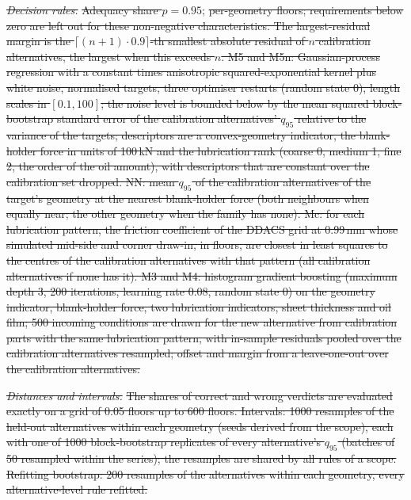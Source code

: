 \documentclass[pdflatex,sn-basic,lineno]{sn-jnl} %
\providecommand{\DIFdel}[1]{{\protect\color{red}\sout{#1}}}                      %
\providecommand{\DIFdelbegin}{} %
\providecommand{\DIFdelend}{} %
\newcommand{\DIFscaledelfig}{0.5}
\newlength{\DIFdelgraphicswidth} %
\newlength{\DIFdelgraphicsheight} %
\newcommand{\DIFdelincludegraphics}[2][]{%
\sbox{\DIFdelgraphicsbox}{\DIFOincludegraphics[#1]{#2}}%
\settoboxwidth{\DIFdelgraphicswidth}{\DIFdelgraphicsbox} %
\settoboxtotalheight{\DIFdelgraphicsheight}{\DIFdelgraphicsbox} %
\scalebox{\DIFscaledelfig}{%
\parbox[b]{\DIFdelgraphicswidth}{\usebox{\DIFdelgraphicsbox}\\[-\baselineskip] \rule{\DIFdelgraphicswidth}{0em}}\llap{\resizebox{\DIFdelgraphicswidth}{\DIFdelgraphicsheight}{%
\setlength{\unitlength}{\DIFdelgraphicswidth}%
\begin{picture}(1,1)%
\thicklines\linethickness{2pt} %
{\color[rgb]{1,0,0}\put(0,0){\framebox(1,1){}}}%
{\color[rgb]{1,0,0}\put(0,0){\line( 1,1){1}}}%
{\color[rgb]{1,0,0}\put(0,1){\line(1,-1){1}}}%
\end{picture}%
}\hspace*{3pt}}} %
} %
\DeclareRobustCommand{\DIFdelbegin}{\DIFOdelbegin \let\includegraphics\DIFdelincludegraphics} %
\DeclareRobustCommand{\DIFdelend}{\DIFOaddend \let\includegraphics\DIFOincludegraphics} %
\begin{document}
\emph{\DIFdel{Decision rules.}} %
\DIFdel{Adequacy share $p=0.95$}\DIFdelend ; \DIFdelbegin \DIFdel{per-geometry floors; requirements below zero are left out for these non-negative characteristics. The largest-residual margin is the $\lceil (n+1)\cdot 0.9\rceil$-th smallest absolute residual of $n$ calibration alternatives, the largest when this exceeds $n$. M5 and M5n: Gaussian-process regression with a constant times anisotropic squared-exponential kernel plus white noise, normalised targets, three optimiser restarts (random state 0), length scales in $[0.1, 100]$; the noise level is bounded below by the mean squared block-bootstrap standard error of the calibration alternatives' $q_{95}$ relative to the variance of the targets; descriptors are a convex-geometry indicator, the blank-holder force in units of 100\,kN and the lubrication rank (coarse 0, medium 1, fine 2, the order of the oil amount), with descriptors that are constant over the calibration set dropped. NN: mean $q_{95}$ of the calibration alternatives of the target's geometry at the nearest blank-holder force (both neighbours when equally near; the other geometry when the family has none). Mc: for each lubrication pattern, the friction coefficient of the DDACS grid at 0.99\,mm whose simulated mid-side and corner draw-in, in floors, are closest in least squares to the centres of the calibration alternatives with that pattern (all calibration alternatives if none has it). M3 and M4: histogram gradient boosting (maximum depth 3, 200 iterations, learning rate 0.08, random state 0) on the geometry indicator, blank-holder force, two lubrication indicators, sheet thickness and oil film; 500 incoming conditions are drawn for the new alternative from calibration parts with the same lubrication pattern, with in-sample residuals pooled over the calibration alternatives resampled; offset and margin from a leave-one-out over the calibration alternatives.
}%

\emph{\DIFdel{Distances and intervals.}} %
\DIFdel{The shares of correct and wrong verdicts are evaluated exactly on a grid of 0.05 floors up to 600 floors. Intervals: 1000 resamples of the held-out alternatives within each geometry (seeds derived from the scope), each with one of 1000 block-bootstrap replicates of every alternative's $q_{95}$ (batches of 50 resampled within the series); the resamples are shared by all rules of a scope. Refitting bootstrap: 200 resamples of the alternatives within each geometry, every alternative-level rule refitted.
}%
\end{document}
